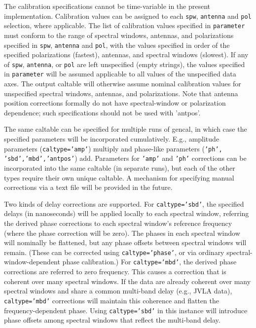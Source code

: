 {The calibration specifications cannot be time-variable in the present
implementation.  Calibration values can be assigned to each {\tt spw},
{\tt antenna} and {\tt pol} selection, where applicable.  The list 
of calibration values specified in {\tt parameter} must conform to
the range of spectral windows, antennas, and polarizations specified
in {\tt spw}, {\tt antenna} and {\tt pol}, with the values specified
in order of the specified polarizations (fastest), antennas, and spectral
windows (slowest).  If any of {\tt spw}, 
{\tt antenna}, or {\tt pol} are left unspecified (empty strings), the
values specified in {\tt parameter} will be assumed applicable to
all values of the unspecified data axes. The output caltable will
otherwise assume nominal calibration values for unspecified spectral
windows, antennas, and polarizations.  Note that antenna position
corrections formally do not have spectral-window or polarization
dependence; such specifications should not be used with 'antpos'.

The same caltable can be specified for multiple runs of gencal, in
which case the specified parameters will be incorporated cumulatively.
E.g., amplitude parameters ({\tt caltype='amp'}) multiply and
phase-like parameters ({\tt 'ph', 'sbd','mbd','antpos'}) add.
Parameters for {\tt 'amp'} and {\tt 'ph'} corrections can be
incorporated into the same caltable (in separate runs), but each of
the other types require their own unique caltable.  A mechanism for
specifying manual corrections via a text file will be provided in the
future.

Two kinds of delay corrections are supported.  For {\tt caltype='sbd'},
the specified delays (in nanoseconds) will be applied locally to 
each spectral window, referring the derived phase corrections to
each spectral window's reference frequency (where the phase correction
will be zero).  The phases in each spectral window will nominally be
flattened, but any phase offsets between spectral windows will remain.
(These can be corrected using {\tt caltype='phase'}, or via ordinary
spectral-window-dependent phase calibration.)  For {\tt caltype='mbd'},
the derived phase corrections are referred to zero frequency.  This
causes a correction that is coherent over many spectral windows. 
If the data are already coherent over many spectral windows and share
a common multi-band delay (e.g., JVLA data), {\tt caltype='mbd'} 
corrections will maintain this coherence and flatten the 
frequency-dependent phase.  Using {\tt caltype='sbd'} in this instance
will introduce phase offsets among spectral windows that reflect
the multi-band delay.  

}
